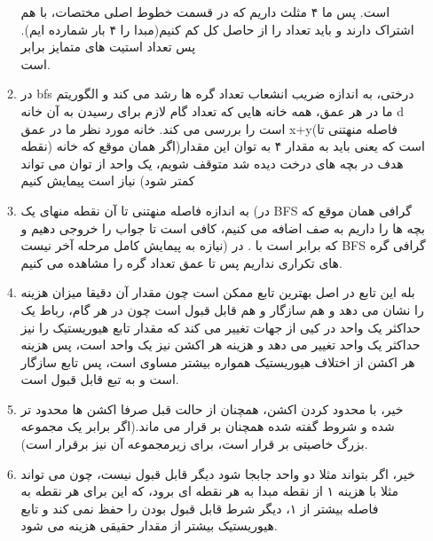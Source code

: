 \documentclass[11pt]{article}
\begin{document}
\begin{enumerate}
\begin{enumerate}
		است. پس ما ۴ مثلث داریم که در قسمت خطوط اصلی مختصات، با هم اشتراک دارند و باید تعداد 
		را از حاصل کل کم کنیم(مبدا را ۴ بار شمارده ایم). پس تعداد استیت های متمایز برابر\\
		است.\\
		\item
		در bfs درختی، به اندازه ضریب انشعاب تعداد گره ها رشد می کند و الگوریتم ما در هر عمق، همه خانه هایی که تعداد گام لازم برای رسیدن به آن خانه d است را بررسی می کند. خانه مورد نظر ما در عمق x+y(فاصله منهتنی تا نقطه) است که یعنی باید به مقدار ۴ به توان این مقدار(اگر همان موقع که خانه هدف در بچه های درخت دیده شد متوقف شویم، یک واحد از توان می تواند کمتر شود) نیاز است پیمایش کنیم\\
		\item
		به اندازه فاصله منهتنی تا آن نقطه منهای یک (در BFS گرافی همان موقع که بچه ها را داریم به صف اضافه می کنیم، کافی است تا جواب را خروجی دهیم و نیازه به پیمایش کامل مرحله آخر نیست) که برابر است با 
		.
		در BFS گرافی گره های تکراری نداریم پس تا عمق
		تعداد 
		گره را مشاهده می کنیم.
		\item
		بله این تابع در اصل بهترین تابع ممکن است چون مقدار آن دقیقا میزان هزینه را نشان می دهد و هم سازگار و هم قابل قبول است چون در هر گام، رباط یک حداکثر یک واحد در کیی از جهات تغییر می کند که مقدار تابع هیوریستیک را نیز حداکثر یک واحد تغییر می دهد و هزینه هر اکشن نیز یک واحد است، پس هزینه هر اکشن از اختلاف هیوریستیک همواره بیشتر مساوی است، پس تابع سازگار است و به تبع قابل قبول است.\\
		\item
		خیر، با محدود کردن اکشن، همچنان از حالت قبل صرفا اکشن ها محدود تر شده و شروط گفته شده همچنان بر قرار می ماند.(اگر برابر یک مجموعه بزرگ خاصیتی بر قرار است، برای زیرمجموعه‌ آن نیز برقرار است).
		\item
		خیر، اگر بتواند مثلا دو واحد جابجا شود دیگر قابل قبول نیست، چون می تواند مثلا با هزینه ۱ از نقطه مبدا به هر نقطه ای برود، که این برای هر نقطه به فاصله بیشتر از ۱، دیگر شرط قابل قبول بودن را حفظ نمی کند و تابع هیوریستیک بیشتر از مقدار حقیقی هزینه می شود.\\
		 

\end{enumerate}
\end{enumerate}
\end{document}
